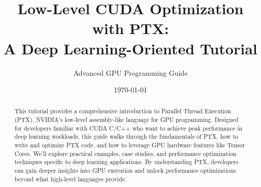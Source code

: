\documentclass[11pt,a4paper]{article}
\title{\LARGE \textbf{Low-Level CUDA Optimization with PTX:\\A Deep Learning-Oriented Tutorial}}
\author{Advanced GPU Programming Guide}
\date{\today}
\begin{document}
\maketitle
\thispagestyle{empty}

\begin{abstract}
This tutorial provides a comprehensive introduction to Parallel Thread Execution (PTX), NVIDIA's low-level assembly-like language for GPU programming. Designed for developers familiar with CUDA C/C++ who want to achieve peak performance in deep learning workloads, this guide walks through the fundamentals of PTX, how to write and optimize PTX code, and how to leverage GPU hardware features like Tensor Cores. We'll explore practical examples, case studies, and performance optimization techniques specific to deep learning applications. By understanding PTX, developers can gain deeper insights into GPU execution and unlock performance optimizations beyond what high-level languages provide.
\end{abstract}

\vspace{1cm}
\renewcommand{\contentsname}{\color{blue!70!black}Table of Contents}
\tableofcontents
\thispagestyle{empty}
\newpage
\end{document}
